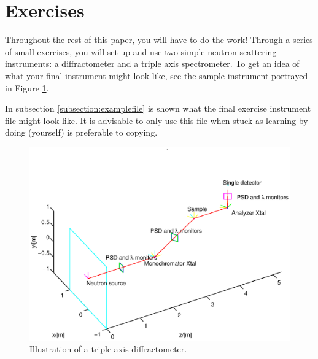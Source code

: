 \section{Exercises}
Throughout the rest of this paper, you will have to do the work!
Through a series of small exercises, you will set up and use two simple
neutron scattering instruments: a diffractometer and a triple axis spectrometer. To get an idea of what your final
instrument might look like, see the sample instrument portrayed in Figure \ref{instr.eps}.

In subsection \ref{subsection:examplefile} is shown what the final exercise instrument file might look like. It is advisable to only use this file when stuck as learning by doing (yourself) is preferable to copying.
\begin{figure}[htb!]
\begin{center}
\includegraphics[width=12cm]{pics/instr.eps}
\end{center}
\caption{Illustration of a triple axis diffractometer.}
\label{instr.eps}
\end{figure}
